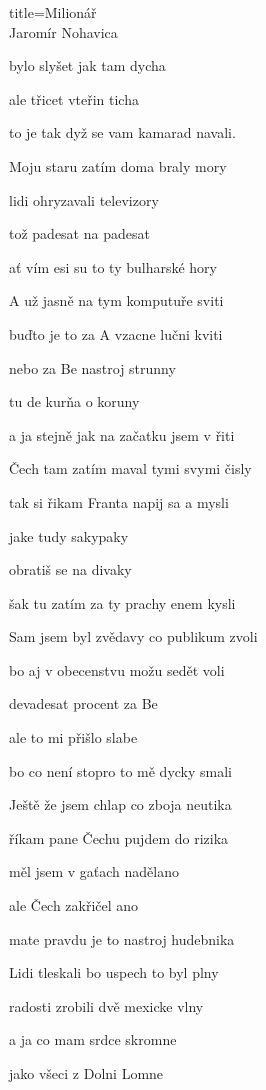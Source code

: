 \begin{song}{title=\centering Milionář \\\normalsize Jaromír Nohavica  \vspace*{-0.3cm}}
{\begin{minipage}[t]{0.48\textwidth}
bylo slyšet jak tam dycha 

ale třicet vteřin ticha 

to je tak dyž se vam kamarad navali.

\sloka
Moju staru zatím doma braly mory 

lidi ohryzavali televizory 

tož padesat na padesat 

ať vím esi su to ty bulharské hory

\end{minipage}\begin{minipage}[t]{0.48\textwidth}\setlength{\parindent}{0.45cm}\vspace*{0.55cm}  %


\sloka
A už jasně na tym komputuře sviti 

buďto je to za A vzacne lučni kviti 

nebo za Be nastroj strunny 

tu de kurňa o koruny 

a ja stejně jak na začatku jsem v řiti 

\sloka
Čech tam zatím maval tymi svymi čisly

tak si řikam Franta napij sa a mysli 

jake tudy sakypaky 

obratiš se na divaky

šak tu zatím za ty prachy enem kysli 

\sloka
Sam jsem byl zvědavy co publikum zvoli 

bo aj v obecenstvu možu sedět voli 

devadesat procent za Be 

ale to mi přišlo slabe 

bo co není stopro to mě dycky smali 

\sloka
Ještě že jsem chlap co zboja neutika 

říkam pane Čechu pujdem do rizika 

měl jsem v gaťach nadělano 

ale Čech zakřičel ano 

mate pravdu je to nastroj hudebnika

\sloka 
Lidi tleskali bo uspech to byl plny 

radosti zrobili dvě mexicke vlny 

a ja co mam srdce skromne 

jako všeci z Dolni Lomne 


\end{minipage}}
\end{song}
